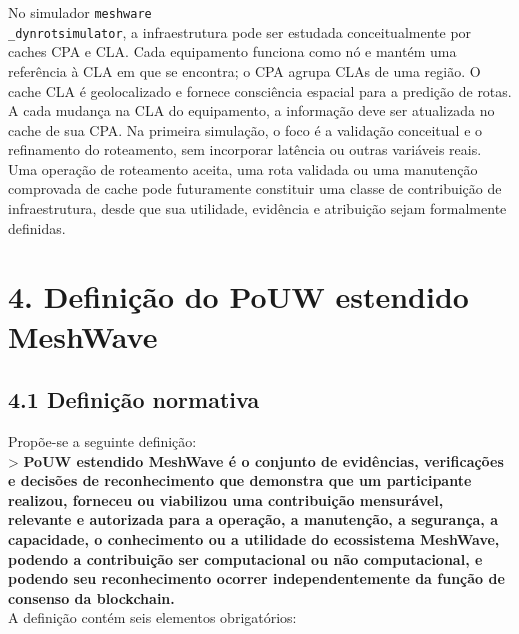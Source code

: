 \documentclass[12pt,a4paper]{article}
\begin{document}
No simulador \texttt{meshware\\_dynrotsimulator}, a infraestrutura pode ser estudada conceitualmente por caches CPA e CLA. Cada equipamento funciona como nó e mantém uma referência à CLA em que se encontra; o CPA agrupa CLAs de uma região. O cache CLA é geolocalizado e fornece consciência espacial para a predição de rotas. A cada mudança na CLA do equipamento, a informação deve ser atualizada no cache de sua CPA. Na primeira simulação, o foco é a validação conceitual e o refinamento do roteamento, sem incorporar latência ou outras variáveis reais. Uma operação de roteamento aceita, uma rota validada ou uma manutenção comprovada de cache pode futuramente constituir uma classe de contribuição de infraestrutura, desde que sua utilidade, evidência e atribuição sejam formalmente definidas.\\


\section{4. Definição do PoUW estendido MeshWave}

\subsection{4.1 Definição normativa}

Propõe-se a seguinte definição:\\

> \textbf{PoUW estendido MeshWave é o conjunto de evidências, verificações e decisões de reconhecimento que demonstra que um participante realizou, forneceu ou viabilizou uma contribuição mensurável, relevante e autorizada para a operação, a manutenção, a segurança, a capacidade, o conhecimento ou a utilidade do ecossistema MeshWave, podendo a contribuição ser computacional ou não computacional, e podendo seu reconhecimento ocorrer independentemente da função de consenso da blockchain.}\\

A definição contém seis elementos obrigatórios:\\
\end{document}
